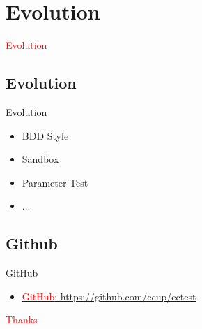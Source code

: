 \section{Evolution}
\label{sec:evolution}

\begin{frame}
  \begin{center}
    \Huge{\textcolor{red}{Evolution}}
  \end{center}
\end{frame}

\subsection{Evolution}

\begin{frame}{Evolution}
    \begin{itemize}
      \item BDD Style
      \item Sandbox
      \item Parameter Test
      \item ...
    \end{itemize}
\end{frame}

\subsection{Github}

\begin{frame}{GitHub}
    \begin{itemize}
    \item \href{https://github.com/ccup/cctest}{\textcolor{red}{GitHub}: https://github.com/ccup/cctest}
    \end{itemize}
\end{frame}

\begin{frame}
  \begin{center}
    \Huge{\textcolor{red}{Thanks}}
  \end{center}
\end{frame}